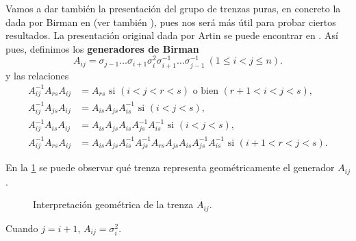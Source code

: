 \documentclass[bibtex, anon]{TEMat-article}
\begin{document}
Vamos a dar también la presentación del grupo de trenzas puras, en concreto la dada por Birman en \cite{Birman} (ver también \cite{polynomial}), pues nos será más útil para probar ciertos resultados. La presentación original dada por Artin se puede encontrar en \cite{Artin}. Así pues, definimos los \textbf{generadores de Birman}
\begin{equation}\label{birman}
A_{ij}=\sigma_{j-1}\dots\sigma_{i+1}\sigma_i^2\sigma_{i+1}^{-1}\dots\sigma_{j-1}^{-1}\ (1\leq i<j\leq n).
\end{equation}
y las relaciones %
\begin{align*}
A_{ij}^{-1}A_{rs}A_{ij}&=A_{rs}\text{ si } (i<j<r<s)\text{ o bien } (r+1<i<j<s),\\
A_{ij}^{-1}A_{js}A_{ij}&=A_{is}A_{js}A_{is}^{-1} \text{ si } (i<j<s),\\
A_{ij}^{-1}A_{is}A_{ij}&=A_{is}A_{js}A_{is}A_{js}^{-1}A_{is}^{-1}\text{ si } (i<j<s),\\
A_{ij}^{-1}A_{rs}A_{ij}&=A_{is}A_{js}A_{is}^{-1}A_{js}^{-1}A_{rs}A_{js}A_{is}A_{js}^{-1}A_{is}^{-1}\text{ si } (i+1<r<j<s).
\end{align*}

En la \cref{generador} se puede observar qué trenza representa geométricamente el generador $A_{ij}$. 

\begin{figure}[h!]
	\centering
	\caption{Interpretación geométrica de la trenza $A_{ij}$.}\label{generador}
\end{figure}


\begin{nota}
	Cuando $j=i+1$, $A_{ij}=\sigma_i^2$. 
\end{nota}
\end{document}

